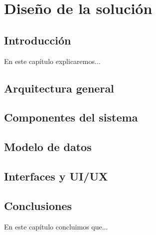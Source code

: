 \chapter{Diseño de la solución}\label{cap:diseño}

\section{Introducción}
En este capítulo explicaremos...

\section{Arquitectura general}

\section{Componentes del sistema}

\section{Modelo de datos}

\section{Interfaces y UI/UX}

\section{Conclusiones}
En este capítulo concluimos que...
